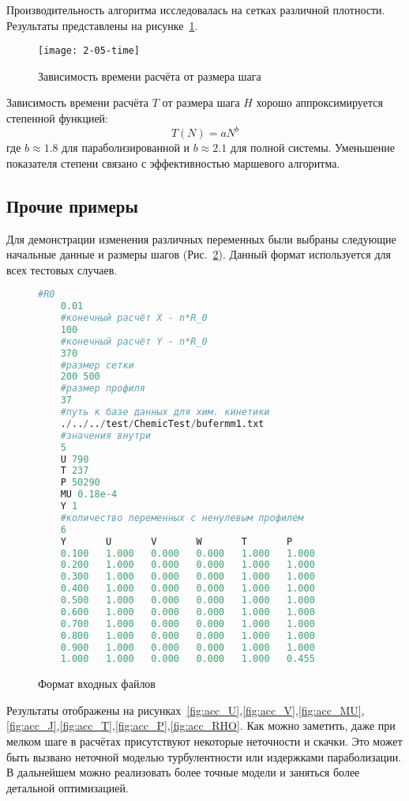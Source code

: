 Производительность алгоритма исследовалась на сетках различной плотности. Результаты представлены на рисунке~\ref{fig:performance}.

\begin{figure}
\centering
\texttt{[image: 2-05-time]}
\caption{Зависимость времени расчёта от размера шага}
\label{fig:performance}
\end{figure}

Зависимость времени расчёта $T$ от размера шага $H$ хорошо аппроксимируется степенной функцией:
\begin{equation}
T(N) = aN^b
\end{equation}
где $b \approx 1.8$ для параболизированной и $b \approx 2.1$ для полной системы. Уменьшение показателя степени связано с эффективностью маршевого алгоритма.

\subsection{Прочие примеры}

Для демонстрации изменения различных переменных были выбраны следующие начальные данные и размеры шагов (Рис.~\ref{src:format}). Данный формат используется для всех тестовых случаев.

\begin{figure}
\begin{lstlisting}[language=Python, escapeinside=``]
    #R0
    0.01
    #конечный расчёт X - n*R_0
    100
    #конечный расчёт Y - n*R_0
    370
    #размер сетки
    200 500
    #размер профиля
    37
    #путь к базе данных для хим. кинетики
    ./../../test/ChemicTest/bufermm1.txt
    #значения внутри
    5
    U 790
    T 237
    P 50290
    MU 0.18e-4
    Y 1
    #количество переменных с ненулевым профилем
    6
    Y       U       V       W       T       P
    0.100   1.000   0.000   0.000   1.000   1.000
    0.200   1.000   0.000   0.000   1.000   1.000
    0.300   1.000   0.000   0.000   1.000   1.000
    0.400   1.000   0.000   0.000   1.000   1.000
    0.500   1.000   0.000   0.000   1.000   1.000
    0.600   1.000   0.000   0.000   1.000   1.000
    0.700   1.000   0.000   0.000   1.000   1.000
    0.800   1.000   0.000   0.000   1.000   1.000
    0.900   1.000   0.000   0.000   1.000   1.000
    1.000   1.000   0.000   0.000   1.000   0.455
\end{lstlisting}
\caption{Формат входных файлов}
\label{src:format}
\end{figure}

Результаты отображены на рисунках~\ref{fig:acc_U},\ref{fig:acc_V},\ref{fig:acc_MU},\ref{fig:acc_J},\ref{fig:acc_T},\ref{fig:acc_P},\ref{fig:acc_RHO}. Как можно заметить, даже при мелком шаге в расчётах присутствуют некоторые неточности и скачки. Это может быть вызвано неточной моделью турбулентности или издержками параболизации. В дальнейшем можно реализовать более точные модели и заняться более детальной оптимизацией.

